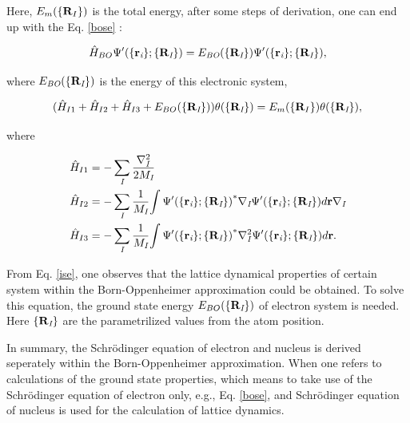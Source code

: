\documentclass[a4paper, 12pt, titlepage,oneside,drop]{kthesis}
\begin{document}
\noindent Here, $E_{m}(\{{\textbf R_I}\})$ is the total energy, after some steps of derivation, one can end up with the Eq. \ref{bose} :

\begin{equation}\label{bose}
{\hat{H}}_{BO} {\Psi'(\{\textbf{r}_{\textit i}\}; \{{\textbf R}_{\textit I}\})} = E_\textit{BO}{(\{\textbf{R}_{\textit I}\})} {\Psi'(\{\textbf{r}_{\textit i}\}; \{{\textbf R}_{\textit I}\})},
\end{equation}

\noindent where $E_\textit{BO}{(\{\textbf{R}_{\textit I}\})}$ is the energy of this electronic system,

\begin{equation}\label{ise}
( \hat{H}_{I1}+\hat{H}_{I2}+\hat{H}_{I3}+E_{BO}(\{{\textbf R}_{\textit I}\}) ) {\theta(\{\textbf{R}_{\textit I}\})} = E_{m}(\{{\textbf R_I}\}) {\theta(\{\textbf{R}_{\textit I}\})},
\end{equation}

where

\begin{equation}\begin{split}
 &  \hat{H}_{I1} = - \sumi<I> \frac{{{\nabla}_{\textit{I}}^{2}}}{2 M_\textit{I}}   \\
 &  \hat{H}_{I2} = - \sumi<I> \frac{1}{M_\textit{I}} {\int {\Psi'(\{\textbf{r}_{\textit{i}}\}; \{\textbf{R}_{\textit I}\})}^{\ast} {{\nabla}_{\textit{I}}} {{\Psi'(\{\textbf{r}_{\textit{i}} \}; \{\textbf{R}_{\textit I}\})}} d {\textbf r }} {{\nabla}_{\textit{I}}}  \\
 &  \hat{H}_{I3} = - \sumi<I> \frac{1}{M_\textit{I}} {\int {{\Psi'(\{\textbf{r}_{\textit{i}}\}; \{\textbf{R}_{\textit I}\})}}^{\ast} {{\nabla}_{\textit{I}}^{2}} {{\Psi'(\{\textbf{r}_{\textit{i}} \}; \{\textbf{R}_{\textit I}\})}} d {\textbf r }}. 
\end{split}\end{equation}

From Eq. \ref{ise}, one observes that the lattice dynamical properties of certain system within the Born-Oppenheimer approximation could be obtained. To solve this equation,
the ground state energy $E_{BO}(\{{{\textbf R}_{\textit I}}\})$ of electron system is needed. Here $\{{\textbf R}_{\textit I}\}$ are the parametrilized values from the atom position.
 
In summary, the Schrödinger equation of electron and nucleus is derived seperately within the Born-Oppenheimer approximation. When one refers to calculations of the ground state properties,
which means to take use of the Schrödinger equation of electron only, e.g., Eq. \ref{bose}, and Schrödinger equation of nucleus is used for the calculation of lattice dynamics.
\end{document}
